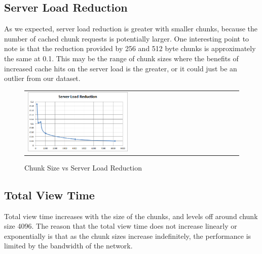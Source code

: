 \subsection{Server Load Reduction} \label{sec:load}

As we expected, server load reduction is greater with smaller chunks, because
the number of cached chunk requests is potentially larger. One interesting point
to note is that the reduction provided by 256 and 512 byte chunks is
approximately the same at 0.1. This may be the range of chunk sizes where the
benefits of increased cache hits on the server load is the greater, or it could
just be an outlier from our dataset.

\begin{figure}[!htbp]
    \begin{center}
        \begin{tabular}{l}
            \includegraphics[width=0.48\textwidth]{fig/load.png}
            \\
        \end{tabular}
        \caption{Chunk Size vs Server Load Reduction}
        \label{fig:load}
    \end{center}
\end{figure}

\subsection{Total View Time} \label{sec:view}

Total view time increases with the size of the chunks, and levels off around
chunk size 4096. The reason that the total view time does not increase linearly
or exponentially is that as the chunk sizes increase indefinitely, the
performance is limited by the bandwidth of the network.


